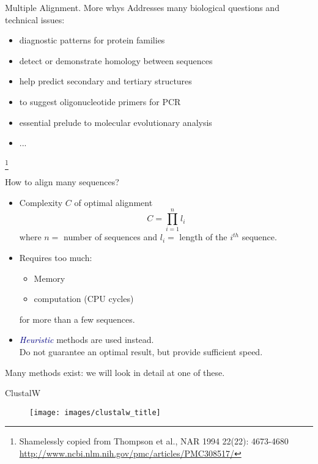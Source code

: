 \documentclass[pdf]{beamer}
\newcommand\blfootnote[1]{%
  \begingroup  %
  \renewcommand\thefootnote{}\footnote{#1}%
  \addtocounter{footnote}{-1}  %
  \endgroup
}
\begin{document}
\begin{frame}{Multiple Alignment. More whys}
  Addresses many biological questions and technical issues:
  \begin{itemize}
  \item diagnostic patterns for protein families
  \item detect or demonstrate homology between sequences
  \item help predict secondary and tertiary structures
  \item to suggest oligonucleotide primers for PCR
  \item essential prelude to molecular evolutionary analysis
  \item ...
  \end{itemize}
  \blfootnote{Shamelessly copied from Thompson et al., NAR 1994 22(22): 4673-4680\\
    \url{http://www.ncbi.nlm.nih.gov/pmc/articles/PMC308517/}
  }
\end{frame}

\begin{frame}{How to align many sequences?}
  \begin{itemize}
  \item Complexity $C$ of optimal alignment
    $$ C = \prod_{i=1}^{n} l_i $$
    where $n = $ number of sequences and $l_i=$ length of the
    $i^{th}$ sequence.

  \item Requires too much:
    \begin{itemize}
    \item Memory
    \item computation (CPU cycles)
    \end{itemize}
    for more than a few sequences.

  \item \textcolor{navy}{\emph{Heuristic}} methods are used instead. \\Do not guarantee an
  optimal result, but provide sufficient speed.
  \end{itemize}
  
  Many methods exist: we will look in detail at one of these.
\end{frame}

\begin{frame}{ClustalW}
  \begin{figure}[ht]
    \texttt{[image: images/clustalw\_title]}
  \end{figure}
\end{frame}
\end{document}
